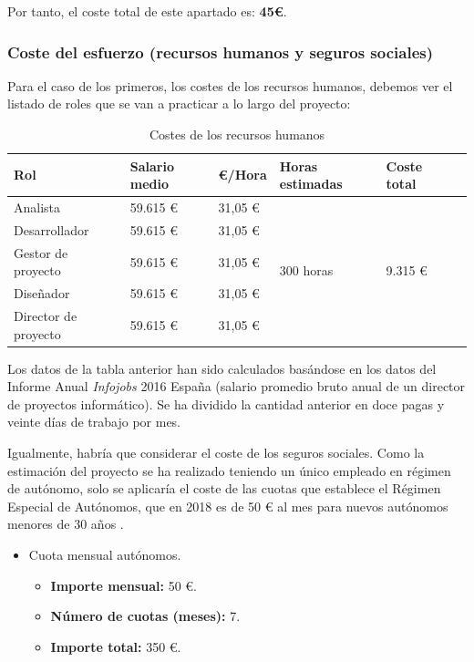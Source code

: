 \documentclass[twoside]{report}
\begin{document}
Por tanto, el coste total de este apartado es: \textbf{45\euro}.

\subsubsection{Coste del esfuerzo (recursos humanos y seguros sociales)}

Para el caso de los primeros, los costes de los recursos humanos, debemos ver el listado de roles que se van a practicar a lo largo del proyecto:

\begin{table}[H]
\center
\begin{tabular}{|l|l|l|l|l|l|}
\hline
Rol                & Salario medio & \euro/Hora   & Horas estimadas & Coste total \\ \hline
Analista           & 59.615 \euro      & 31,05 \euro & \multirow{5}{*}{300 horas} & \multirow{5}{*}{9.315 \euro} \\\cline{1-3}
Desarrollador      & 59.615 \euro      & 31,05 \euro  & & \\\cline{1-3}
Gestor de proyecto & 59.615 \euro      & 31,05 \euro & & \\ \cline{1-3}
Diseñador          & 59.615 \euro      & 31,05 \euro & & \\ \cline{1-3}
Director de proyecto & 59.615 \euro    & 31,05 \euro & & \\ \cline{1-3}
\hline
\end{tabular}
\caption{Costes de los recursos humanos}
\end{table}

Los datos de la tabla anterior han sido calculados basándose en los datos del Informe Anual \textit{Infojobs} 2016 España \cite{infojobs2016} (salario promedio bruto anual de un director de proyectos informático). Se ha dividido la cantidad anterior en doce pagas y veinte días de trabajo por mes.

Igualmente, habría que considerar el coste de los seguros sociales. Como la estimación del proyecto se ha realizado teniendo un único empleado en régimen de autónomo, solo se aplicaría el coste de las cuotas que establece el Régimen Especial de Autónomos, que en 2018 es de 50 \euro \vspace{0.1cm} al mes para nuevos autónomos menores de 30 años \cite{segsocialautonomos}.

\begin{itemize}
\item Cuota mensual autónomos.
	\begin{itemize}
	\item \textbf{Importe mensual:} 50 \euro.
	\item \textbf{Número de cuotas (meses): } 7.
	\item \textbf{Importe total: } 350 \euro.
	\end{itemize}
\end{itemize}
\end{document}
